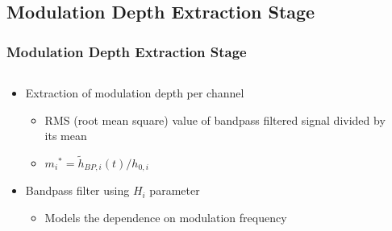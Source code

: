 \documentclass{beamer}
\begin{document}
\subsection{Modulation Depth Extraction Stage}
\begin{frame}
  \frametitle{Modulation Depth Extraction Stage}
  \begin{columns}
    \begin{column}{0.5\textwidth}
      \begin{itemize}
        \item<1-> Extraction of modulation depth per channel
        \begin{itemize}
          \item<2-> RMS (root mean square) value of bandpass filtered signal
            divided by its mean
          \item<3-> ${m_i}^* = \tilde{h}_{BP,i}(t)/h_{0,i}$
        \end{itemize}
        \item<4-> Bandpass filter using $H_i$ parameter
        \begin{itemize}
          \item<5-> Models the dependence on modulation frequency
        \end{itemize}
      \end{itemize}
    \end{column}
    \begin{column}{0.5\textwidth}
\end{column}
\end{columns}
\end{frame}
\end{document}
